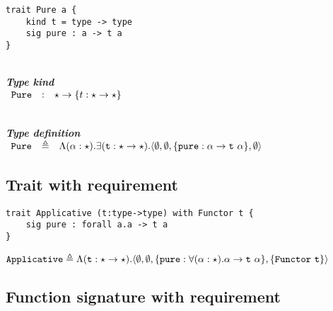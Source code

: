 \documentclass{article}[11pt]
\newcommand{\subsubsubsection}[1]
{
    ~\\
    {\bf {\em #1}} \\
}
\newcommand{\term}[1]{\verb~#1~}
\begin{document}
    \begin{verbatim}
trait Pure a {
    kind t = type -> type
    sig pure : a -> t a
}
    \end{verbatim}

    \subsubsubsection{Type kind}

    \noindent
    \begin{math}
        \begin{array}{rclp{5cm}}
            \term{Pure} & : & \star \rightarrow \{ t : \star \rightarrow \star \}
        \end{array}
    \end{math}

    \subsubsubsection{Type definition}

    \noindent
    \begin{math}
        \begin{array}{rclp{5cm}}
            \term{Pure} & \triangleq & \Lambda(\alpha:\star).\exists(\term{t}:\star \rightarrow \star).\langle
            \emptyset,
            \emptyset,
            \{ \term{pure} : \alpha \rightarrow \term{t}~\alpha \},
            \emptyset
            \rangle
        \end{array}
    \end{math}

    \subsection{Trait with requirement}\label{subsec:trait-with-requirement}

    \begin{verbatim}
trait Applicative (t:type->type) with Functor t {
    sig pure : forall a.a -> t a
}
    \end{verbatim}

    \noindent
    \begin{math}
        \term{Applicative} \triangleq \Lambda(\term{t}:\star \rightarrow \star).
        \langle
        \emptyset,
        \emptyset,
        \{ \term{pure} : \forall(\alpha:\star).\alpha \rightarrow \term{t}~\alpha \},
        \{ \term{Functor}~\term{t} \}
        \rangle
    \end{math}

    \subsection{Function signature with requirement}\label{subsec:function-signature-with-requirement}
\end{document}

